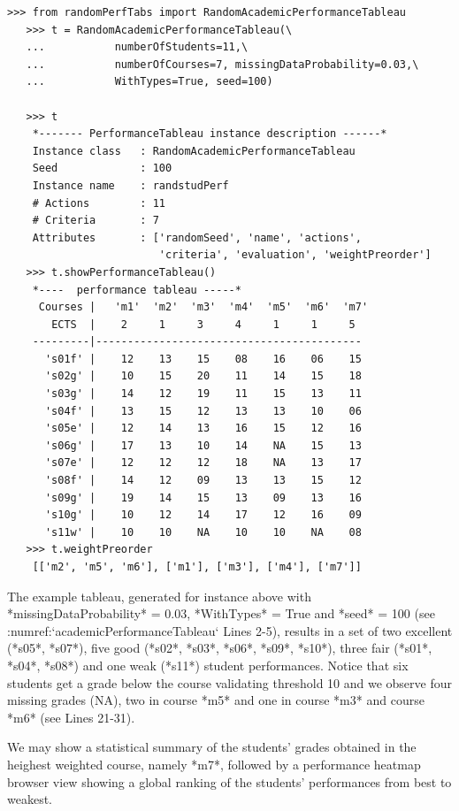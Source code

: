 \begin{lstlisting}[caption={Generating a random academic performance tableau},label=list:5.5,basicstyle=\footnotesize]
   >>> from randomPerfTabs import RandomAcademicPerformanceTableau
   >>> t = RandomAcademicPerformanceTableau(\
   ...           numberOfStudents=11,\
   ...           numberOfCourses=7, missingDataProbability=0.03,\
   ...           WithTypes=True, seed=100)

   >>> t
    *------- PerformanceTableau instance description ------*
    Instance class   : RandomAcademicPerformanceTableau
    Seed             : 100
    Instance name    : randstudPerf
    # Actions        : 11
    # Criteria       : 7
    Attributes       : ['randomSeed', 'name', 'actions',
                        'criteria', 'evaluation', 'weightPreorder']
   >>> t.showPerformanceTableau()
    *----  performance tableau -----*
     Courses |   'm1'  'm2'  'm3'  'm4'  'm5'  'm6'  'm7' 
       ECTS  |    2     1     3     4     1     1     5    
    ---------|------------------------------------------
      's01f' |    12    13    15    08    16    06    15   
      's02g' |    10    15    20    11    14    15    18   
      's03g' |    14    12    19    11    15    13    11   
      's04f' |    13    15    12    13    13    10    06   
      's05e' |    12    14    13    16    15    12    16   
      's06g' |    17    13    10    14    NA    15    13   
      's07e' |    12    12    12    18    NA    13    17   
      's08f' |    14    12    09    13    13    15    12   
      's09g' |    19    14    15    13    09    13    16   
      's10g' |    10    12    14    17    12    16    09   
      's11w' |    10    10    NA    10    10    NA    08
   >>> t.weightPreorder
    [['m2', 'm5', 'm6'], ['m1'], ['m3'], ['m4'], ['m7']]
  \end{lstlisting}
  
The example tableau, generated for instance above with *missingDataProbability* = 0.03, *WithTypes* = True and *seed* = 100 (see :numref:`academicPerformanceTableau` Lines 2-5), results in a set of two excellent (*s05*, *s07*), five good (*s02*, *s03*, *s06*, *s09*, *s10*), three fair (*s01*, *s04*, *s08*) and one weak (*s11*) student performances. Notice that six students get a grade below the course validating threshold 10 and we observe four missing grades (NA), two in course *m5* and one in course *m3* and course *m6* (see Lines 21-31).

We may show a statistical summary of the students' grades obtained in the heighest weighted course, namely *m7*, followed by a performance heatmap browser view showing a global ranking of the students' performances from best to weakest.

